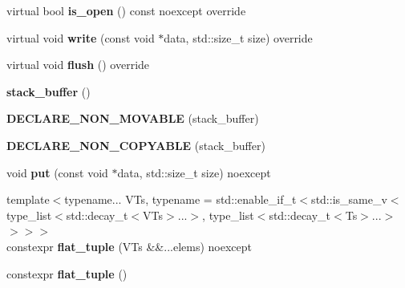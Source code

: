 \begin{CompactItemize}
\item 
\hypertarget{classhope_1_1final_353197e5aca45505be10a0d238a2450b}{
virtual bool \textbf{is\_\-open} () const noexcept override}
\label{classhope_1_1final_353197e5aca45505be10a0d238a2450b}

\item 
\hypertarget{classhope_1_1final_2807c24032cbd21e31befc6b57b0f323}{
virtual void \textbf{write} (const void $\ast$data, std::size\_\-t size) override}
\label{classhope_1_1final_2807c24032cbd21e31befc6b57b0f323}

\item 
\hypertarget{classhope_1_1final_497bcdd6f4bd42b42394a96fec40dba8}{
virtual void \textbf{flush} () override}
\label{classhope_1_1final_497bcdd6f4bd42b42394a96fec40dba8}

\item 
\hypertarget{classhope_1_1final_f2287f80ed00ea759d6b536f3833e1ac}{
\textbf{stack\_\-buffer} ()}
\label{classhope_1_1final_f2287f80ed00ea759d6b536f3833e1ac}

\item 
\hypertarget{classhope_1_1final_c796477284de807d7005387efb105ef0}{
\textbf{DECLARE\_\-NON\_\-MOVABLE} (stack\_\-buffer)}
\label{classhope_1_1final_c796477284de807d7005387efb105ef0}

\item 
\hypertarget{classhope_1_1final_09fdce3a73ab9d34e18ab28a3b5610d4}{
\textbf{DECLARE\_\-NON\_\-COPYABLE} (stack\_\-buffer)}
\label{classhope_1_1final_09fdce3a73ab9d34e18ab28a3b5610d4}

\item 
\hypertarget{classhope_1_1final_72637e3e00e19fbb398bfaf29b548463}{
void \textbf{put} (const void $\ast$data, std::size\_\-t size) noexcept}
\label{classhope_1_1final_72637e3e00e19fbb398bfaf29b548463}

\item 
\hypertarget{classhope_1_1final_3c9415ea9f20efe10be3464183e51592}{
{\footnotesize template$<$typename... VTs, typename  = std::enable\_\-if\_\-t$<$std::is\_\-same\_\-v$<$type\_\-list$<$std::decay\_\-t$<$VTs$>$...$>$, type\_\-list$<$std::decay\_\-t$<$Ts$>$...$>$$>$$>$$>$ }\\constexpr \textbf{flat\_\-tuple} (VTs \&\&...elems) noexcept}
\label{classhope_1_1final_3c9415ea9f20efe10be3464183e51592}

\item 
\hypertarget{classhope_1_1final_e9774b7f26cb585b5ef83deb5a341b3c}{
constexpr \textbf{flat\_\-tuple} ()}
\label{classhope_1_1final_e9774b7f26cb585b5ef83deb5a341b3c}


\end{CompactItemize}

